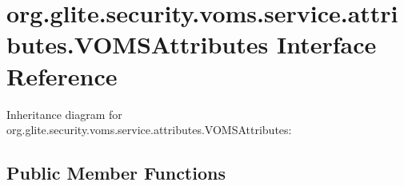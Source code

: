 \hypertarget{interfaceorg_1_1glite_1_1security_1_1voms_1_1service_1_1attributes_1_1VOMSAttributes}{
\section{org.glite.security.voms.service.attributes.VOMSAttributes Interface Reference}
\label{interfaceorg_1_1glite_1_1security_1_1voms_1_1service_1_1attributes_1_1VOMSAttributes}
}


Inheritance diagram for org.glite.security.voms.service.attributes.VOMSAttributes:
\subsection*{Public Member Functions}
